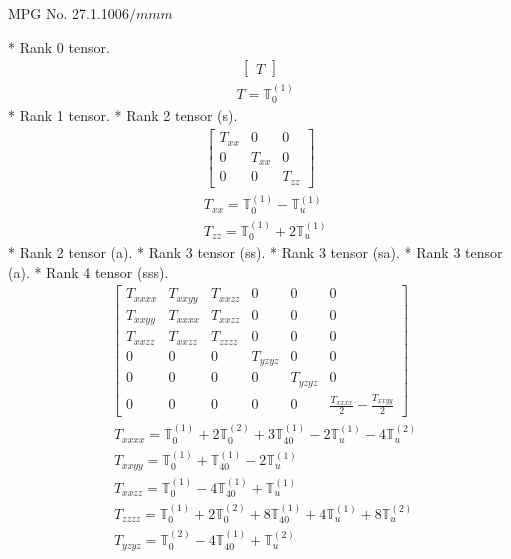 \documentclass[fleqn,8pt,landscape]{jsarticle}
\begin{document}
\setcounter{MaxMatrixCols}{32}

\renewcommand{\tablename}{Table~}
\renewcommand{\figurename}{Figure~}
\begin{center}
\LARGE
MPG No. 27.1.100\quad$6/mmm$
\end{center}
* Rank 0 tensor.
\begin{align*}
\begin{bmatrix} T \end{bmatrix}
\end{align*}
\begin{align*}
& T = \mathbb{T}_{0}^{(1)}
\end{align*}
* Rank 1 tensor.
* Rank 2 tensor (s).
\begin{align*}
\begin{bmatrix} T_{xx} & 0 & 0 \\ 0 & T_{xx} & 0 \\ 0 & 0 & T_{zz} \end{bmatrix}
\end{align*}
\begin{align*}
& T_{xx} = \mathbb{T}_{0}^{(1)} - \mathbb{T}_{u}^{(1)} \\
& T_{zz} = \mathbb{T}_{0}^{(1)} + 2 \mathbb{T}_{u}^{(1)}
\end{align*}
* Rank 2 tensor (a).
* Rank 3 tensor (ss).
* Rank 3 tensor (sa).
* Rank 3 tensor (a).
* Rank 4 tensor (sss).
\begin{align*}
\begin{bmatrix} T_{xxxx} & T_{xxyy} & T_{xxzz} & 0 & 0 & 0 \\ T_{xxyy} & T_{xxxx} & T_{xxzz} & 0 & 0 & 0 \\ T_{xxzz} & T_{xxzz} & T_{zzzz} & 0 & 0 & 0 \\ 0 & 0 & 0 & T_{yzyz} & 0 & 0 \\ 0 & 0 & 0 & 0 & T_{yzyz} & 0 \\ 0 & 0 & 0 & 0 & 0 & \frac{T_{xxxx}}{2} - \frac{T_{xxyy}}{2} \end{bmatrix}
\end{align*}
\begin{align*}
& T_{xxxx} = \mathbb{T}_{0}^{(1)} + 2 \mathbb{T}_{0}^{(2)} + 3 \mathbb{T}_{40}^{(1)} - 2 \mathbb{T}_{u}^{(1)} - 4 \mathbb{T}_{u}^{(2)} \\
& T_{xxyy} = \mathbb{T}_{0}^{(1)} + \mathbb{T}_{40}^{(1)} - 2 \mathbb{T}_{u}^{(1)} \\
& T_{xxzz} = \mathbb{T}_{0}^{(1)} - 4 \mathbb{T}_{40}^{(1)} + \mathbb{T}_{u}^{(1)} \\
& T_{zzzz} = \mathbb{T}_{0}^{(1)} + 2 \mathbb{T}_{0}^{(2)} + 8 \mathbb{T}_{40}^{(1)} + 4 \mathbb{T}_{u}^{(1)} + 8 \mathbb{T}_{u}^{(2)} \\
& T_{yzyz} = \mathbb{T}_{0}^{(2)} - 4 \mathbb{T}_{40}^{(1)} + \mathbb{T}_{u}^{(2)}
\end{align*}
\end{document}
